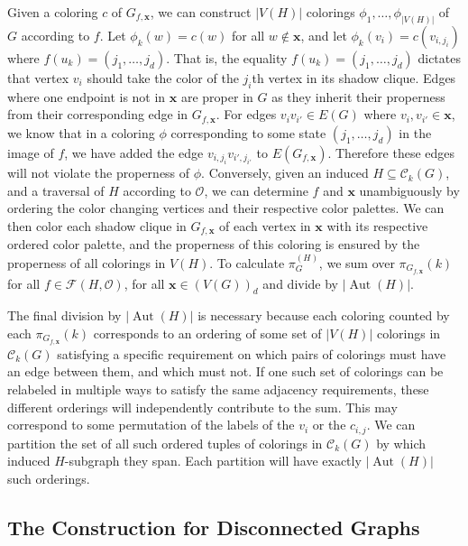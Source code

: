 \documentclass[12pt,reqno,dvipsnames]{amsart}
\theoremstyle{definition}
\begin{document}
Given a coloring $c$ of $G_{f,\mathbf{x}}$, we can construct $|V(H)|$ colorings $\phi_1, \dots, \phi_{|V(H)|}$ of $G$ according to $f$. Let $\phi_k(w)=c(w)$ for all $w\notin \mathbf{x}$, and let $\phi_k(v_i)=c(v_{i,j_i})$ where $f(u_k)=(j_1,\dots,j_d)$. That is, the equality $f(u_k)=(j_1,\dots,j_d)$ dictates that vertex $v_i$ should take the color of the $j_i$th vertex in its shadow clique. Edges where one endpoint is not in $\mathbf{x}$ are proper in $G$ as they inherit their properness from their corresponding edge in $G_{f,\mathbf{x}}$. For edges $v_{i}v_{i'}\in E(G)$ where $v_{i},v_{i'}\in \mathbf{x}$, we know that in a coloring $\phi$ corresponding to some state $(j_1,\dots,j_d)$ in the image of $f$, we have added the edge $v_{i,j_i}v_{i',j_{i'}}$ to $E(G_{f,\mathbf{x}})$. Therefore these edges will not violate the properness of $\phi$. Conversely, given an induced $H\subseteq \mathcal{C}_k(G)$, and a traversal of $H$ according to $\mathcal{O}$, we can determine $f$ and $\mathbf{x}$ unambiguously by ordering the color changing vertices and their respective color palettes. We can then color each shadow clique in $G_{f,\mathbf{x}}$ of each vertex in $\mathbf{x}$ with its respective ordered color palette, and the properness of this coloring is ensured by the properness of all colorings in $V(H)$. To calculate $\pi_G^{(H)}$, we sum over $\pi_{G_{f,\mathbf{x}}}(k)$ for all $f\in\mathcal{F}(H,\mathcal{O})$, for all $\mathbf{x}\in (V(G))_d$ and divide by $|\operatorname{Aut}(H)|$. 

The final division by $|\operatorname{Aut}(H)|$ is necessary because each coloring counted by each $\pi_{G_{f,\mathbf{x}}}(k)$ corresponds to an ordering of some set of $|V(H)|$ colorings in $\mathcal{C}_k(G)$ satisfying a specific requirement on which pairs of colorings must have an edge between them, and which must not. If one such set of colorings can be relabeled in multiple ways to satisfy the same adjacency requirements, these different orderings will independently contribute to the sum. This may correspond to some permutation of the labels of the $v_i$ or the $c_{i,j}$. We can partition the set of all such ordered tuples of colorings in $\mathcal{C}_k(G)$ by which induced $H$-subgraph they span. Each partition will have exactly $|\operatorname{Aut}(H)|$ such orderings.

\subsection{The Construction for Disconnected Graphs}
\end{document}
